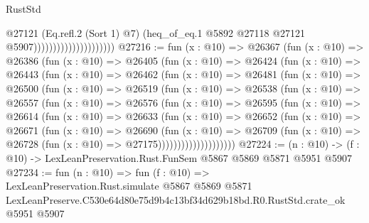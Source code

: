 \begin{lexlean}{RustStd}
\begin{coremodule}
                                            @27121
                                            (Eq.refl.{2} (Sort 1) @7)
                                            (heq_of_eq.{1}
                                              @5892
                                              @27118
                                              @27121
                                              @5907)))))))))))))))))))))
@27216 := fun (x : @10) =>
  @26367
    (fun (x : @10) =>
    @26386
      (fun (x : @10) =>
      @26405
        (fun (x : @10) =>
        @26424
          (fun (x : @10) =>
          @26443
            (fun (x : @10) =>
            @26462
              (fun (x : @10) =>
              @26481
                (fun (x : @10) =>
                @26500
                  (fun (x : @10) =>
                  @26519
                    (fun (x : @10) =>
                    @26538
                      (fun (x : @10) =>
                      @26557
                        (fun (x : @10) =>
                        @26576
                          (fun (x : @10) =>
                          @26595
                            (fun (x : @10) =>
                            @26614
                              (fun (x : @10) =>
                              @26633
                                (fun (x : @10) =>
                                @26652
                                  (fun (x : @10) =>
                                  @26671
                                    (fun (x : @10) =>
                                    @26690
                                      (fun (x : @10) =>
                                      @26709
                                        (fun (x : @10) =>
                                        @26728 (fun (x : @10) => @27175))))))))))))))))))))
@27224 := (n : @10) -> (f : @10) -> LexLeanPreservation.Rust.FunSem @5867 @5869 @5871 @5951 @5907
@27234 := fun (n : @10) =>
  fun (f : @10) =>
  LexLeanPreservation.Rust.simulate
    @5867
    @5869
    @5871
    LexLeanPreserve.C530e64d80e75d9b4c13bf34d629b18bd.R0.RustStd.crate_ok
    @5951
    @5907
\end{coremodule}
\end{lexlean}
